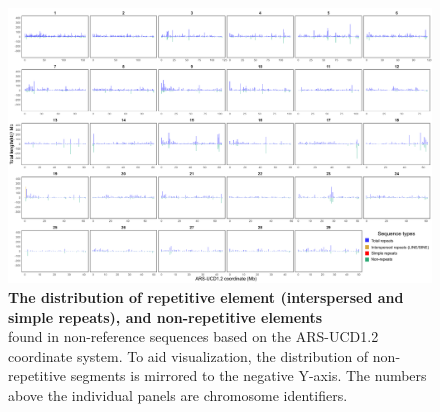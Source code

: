 \documentclass[../main.tex]{subfiles}
\begin{document}
\begin{flushleft}
\begin{landscape}
    \begin{figure}[!htb]
        \centering
        \includegraphics[width=1.5\textwidth]{paper3/supplement/sp48.pdf}
        \caption[Distribution of the repetitive and non-repeat elements]{\textbf{The distribution of repetitive element (interspersed and simple repeats), and non-repetitive elements} \\
        \small{found in non-reference sequences based on the ARS-UCD1.2 coordinate system. To aid visualization, the distribution of non-repetitive segments is mirrored to the negative Y-axis. The numbers above the individual panels are chromosome identifiers.}}
        \label{sup_fig:s48}
    \end{figure}
\end{landscape}

\newpage



\end{flushleft}
\end{document}
